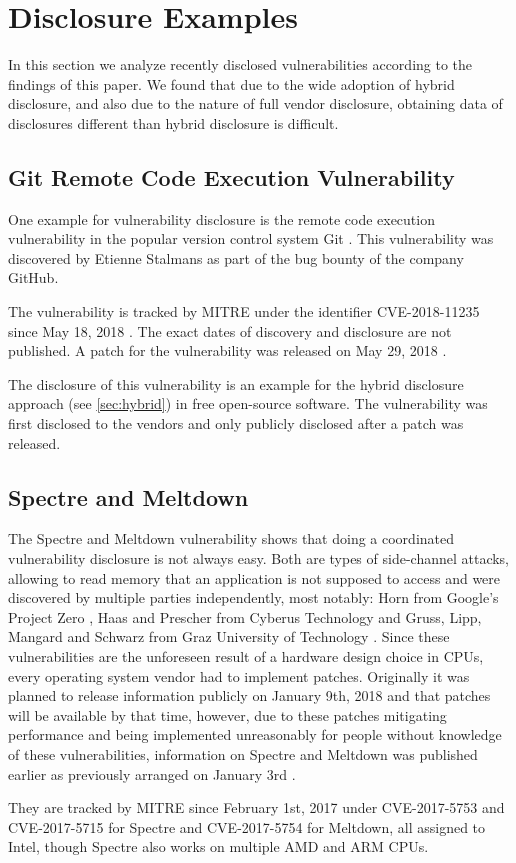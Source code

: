 \section{Disclosure Examples}\label{sec:examples}


In this section we analyze recently disclosed vulnerabilities according to the findings of this paper. We found that due to the wide adoption of hybrid disclosure, and also due to the nature of full vendor disclosure, obtaining data of disclosures different than hybrid disclosure is difficult.

\subsection{Git Remote Code Execution Vulnerability}

One example for vulnerability disclosure is the remote code execution 
vulnerability in the popular version control system Git \cite{Paganini2018}.
This vulnerability was discovered by Etienne Stalmans as part of the bug bounty
of the company GitHub.

The vulnerability is tracked by MITRE under the identifier CVE-2018-11235 since
May 18, 2018 \cite{MITRE2018}. 
The exact dates of discovery and disclosure are not published.
A patch for the vulnerability was released on May 29, 2018 \cite{Hamano2018}.

The disclosure of this vulnerability is an example for the hybrid disclosure
approach (see \autoref{sec:hybrid}) in free open-source software.
The vulnerability was first disclosed to the vendors and only publicly disclosed
after a patch was released.

\subsection{Spectre and Meltdown}

The Spectre \cite{Kocher2018spectre} and Meltdown \cite{Lipp2018meltdown} vulnerability shows that doing a coordinated vulnerability disclosure is not always easy.
Both are types of side-channel attacks, allowing to read memory that an application is not supposed to access and were discovered by multiple parties independently, most notably: Horn from Google's Project Zero \cite{GoogleProjectZeroMeltdownSpectre}, Haas and Prescher from Cyberus Technology \cite{CyberusSpectreMeltdown} and  Gruss, Lipp,  Mangard and Schwarz from Graz University of Technology \cite{GrazSpectreMeltdown}. Since these vulnerabilities are the unforeseen result of a hardware design choice in CPUs, every operating system vendor had to implement patches. Originally it was planned to release information publicly on January 9th, 2018 and that patches will be available by that time, however, due to these patches mitigating performance and being implemented unreasonably for people without knowledge of these vulnerabilities, information on Spectre and Meltdown was published earlier as previously arranged on January 3rd \cite{GuardianMeltdownSpectre}.

They are tracked by MITRE since February 1st, 2017 under CVE-2017-5753 and CVE-2017-5715 for Spectre and CVE-2017-5754 for Meltdown, all assigned to Intel, though Spectre also works on multiple AMD and ARM CPUs.